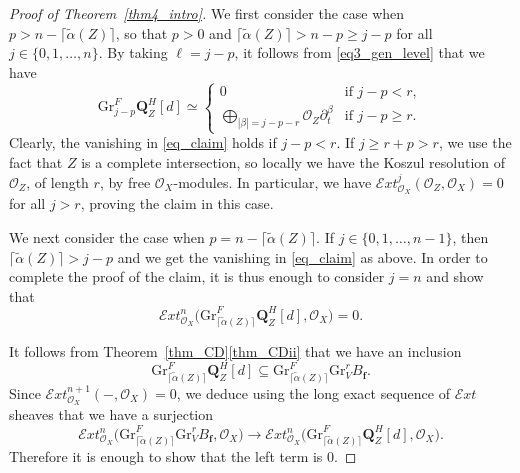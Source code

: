 \documentclass[JEP,XML,SOM,Unicode]{cedram}
\theoremstyle{plain}
\theoremstyle{definition}
\newcommand\Q{{\mathbf Q}}
\newcommand\cE{\mathcal{E}}
\newcommand\cO{\mathcal{O}}
\newcommand\cO{\mathcal{O}}
\newcommand\bff{{\boldsymbol f}}
\let\de\partial
\newcommand\gr{\mathrm{Gr}}
\begin{document}
\begin{proof}[Proof of Theorem~\ref{thm4_intro}]
We first consider the case when $p > n- \lceil \widetilde{\alpha}(Z) \rceil$, so that $p>0$ and $\lceil \widetilde{\alpha}(Z) \rceil > n -p \geq j-p$ for all $j \in \{0,1,\dots, n\}$. By taking $\ell=j-p$, it follows from \eqref{eq3_gen_level} that we have\vspace*{-3pt}
\[ \gr^F_{j-p}\Q^H_Z[d] \simeq \begin{cases}
0& \text{if}\,\,j-p < r, \\
\bigoplus_{|\beta| = j-p -r} \cO_Z \de_t^\beta& \text{if}\,\,j-p \geq r.
\end{cases}\]
Clearly, the vanishing in \eqref{eq_claim} holds if $j-p<r$. If $j\geq r+p > r$, we use the fact that $Z$ is a complete intersection, so
locally we have the Koszul resolution of $\cO_Z$, of length $r$, by free $\cO_X$-modules.
In particular, we have $\cE xt^j_{\cO_X}(\cO_Z,\cO_X) = 0$ for all $j>r$, proving the claim in this case.

We next consider the case when $p = n -\lceil \widetilde{\alpha}(Z) \rceil$. If $j \in \{0,1,\dots, n-1\}$, then $\lceil \widetilde{\alpha}(Z) \rceil>j-p$ and
we get the vanishing in \eqref{eq_claim} as above. In order to complete the proof of the claim, it is thus enough to consider $j=n$ and show that\vspace*{-3pt}
\begin{equation}
\cE xt^n_{\cO_X}\big(\gr^F_{\lceil \widetilde{\alpha}(Z) \rceil} \Q_Z^H[d],\cO_X\big) = 0.
\end{equation}

It follows from Theorem~\ref{thm_CD}\eqref{thm_CDii} that we have an inclusion\vspace*{-3pt}
\[\gr^F_{\lceil \widetilde{\alpha}(Z) \rceil} \Q_Z^H[d] \subseteq \gr^F_{\lceil \widetilde{\alpha}(Z) \rceil} \gr^r_VB_\bff.\]
Since ${\mathcal Ext}_{\cO_X}^{n+1}(-,\cO_X)=0$, we deduce using the long exact sequence of
$\cE xt$ sheaves that we have a surjection\vspace*{-3pt}
\[\cE xt^n_{\cO_X}\big(\gr^F_{\lceil \widetilde{\alpha}(Z) \rceil} \gr^r_V B_\bff,\cO_X\big) \to \cE xt^n_{\cO_X}
\big(\gr^F_{\lceil \widetilde{\alpha}(Z) \rceil}\Q_Z^H[d],\cO_X\big).\]
Therefore it is enough to show that the left term is 0.


\end{proof}
\end{document}
